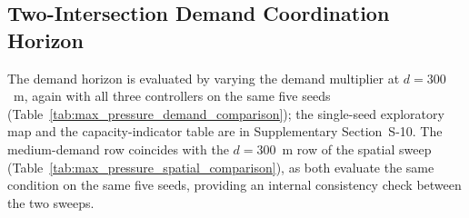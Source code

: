\documentclass[review,12pt]{elsarticle}
\begin{document}
\subsection{Two-Intersection Demand Coordination Horizon}
\label{subsec:demand_horizon}

The demand horizon is evaluated by varying the demand multiplier at $d=300$~m, again with all three controllers on the same five seeds (Table~\ref{tab:max_pressure_demand_comparison}); the single-seed exploratory map and the capacity-indicator table are in Supplementary Section~S-10. The medium-demand row coincides with the $d=300$~m row of the spatial sweep (Table~\ref{tab:max_pressure_spatial_comparison}), as both evaluate the same condition on the same five seeds, providing an internal consistency check between the two sweeps.

\begin{table}[!htbp]
\centering
\small
\setlength{\tabcolsep}{4pt}
\caption{Fully paired demand sweep for the generated
70\%--15\%--15\% turning-movement variants at $d=300$~m, with all
three controllers evaluated on the same five seeds. Waiting times are
five-seed means $\pm$ SD, with the lowest mean waiting time in each
row in bold; $G_{\mathrm{QMIX}}$ and
$G_{\mathrm{MP}}$ are percentage gaps relative to the optimized
fixed-offset benchmark with bootstrap $95\%$ CIs, and negative gaps
indicate that the controller outperforms the benchmark.}
\label{tab:max_pressure_demand_comparison}
\end{table}
\end{document}
